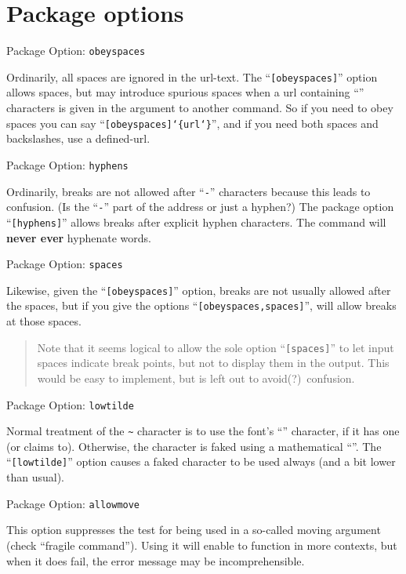 \documentclass[a4paper,11pt]{article}
\begin{document}
\section{Package options}

\newitem Package Option:  \texttt{obeyspaces}

Ordinarily, all spaces are ignored in the url-text.  The
``\texttt{[obeyspaces]}'' option allows spaces, but may introduce
spurious spaces when a url containing ``\cs{}'' characters is given in
the argument to another command. 
So if you need to obey spaces you can say
``\texttt{[obeyspaces]\char`\{url\char`\}}'', and if
you need both spaces and backslashes, use a defined-url.

\newitem Package Option:  \texttt{hyphens}

Ordinarily, breaks are not allowed after ``\texttt{-}'' characters
because this leads to confusion.  (Is the ``\texttt{-}'' part of the
address or just a hyphen?)
The package option ``\texttt{[hyphens]}'' allows breaks after explicit
hyphen characters.  The  command will \textbf{never ever}
hyphenate words.

\newitem Package Option:  \texttt{spaces}

Likewise, given the ``\texttt{[obeyspaces]}'' option, breaks are not 
usually allowed after the spaces, but if you give the options
``\texttt{[obeyspaces,spaces]}'',  will allow breaks at those
spaces.
\begin{quote}
  Note that it seems logical to allow the sole option
  ``\texttt{[spaces]}'' to let input spaces indicate break points, but
  not to display them in the output.  This would be easy to implement,
  but is left out to avoid(?)\ confusion.
\end{quote}

\newitem Package Option:  \texttt{lowtilde}

Normal treatment of the \verb+~+ character is to use the font's
``'' character, if it has one (or claims to).
Otherwise, the character is faked using a mathematical ``''.
The ``\texttt{[lowtilde]}'' option causes a faked character to be used
always (and a bit lower than usual).

\newitem Package Option:  \texttt{allowmove}

This option suppresses the test for  being used in a so-called 
moving argument (check ``fragile command''). Using it will enable 
to function in more contexts, but when it does fail, the error message
may be incomprehensible.
\end{document}
